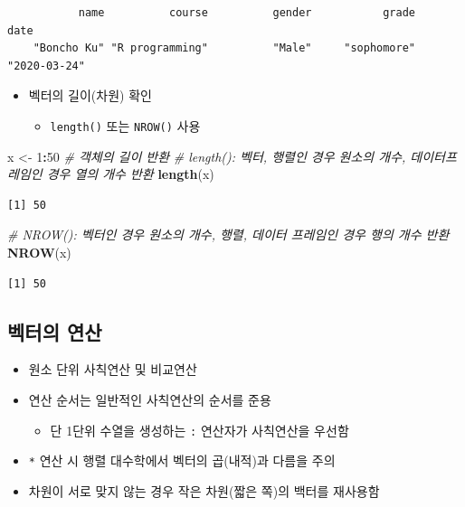 \documentclass[
  11pt,
]{krantz}
\newenvironment{Shaded}{\begin{snugshade}}{\end{snugshade}}
\newcommand{\CommentTok}[1]{\textcolor[rgb]{0.37,0.37,0.37}{\textit{#1}}}
\newcommand{\DecValTok}[1]{\textcolor[rgb]{0.06,0.06,0.06}{#1}}
\newcommand{\KeywordTok}[1]{\textcolor[rgb]{0.27,0.27,0.27}{\textbf{#1}}}
\newcommand{\NormalTok}[1]{#1}
\newcommand{\OperatorTok}[1]{\textcolor[rgb]{0.43,0.43,0.43}{\textbf{#1}}}
\newcommand{\StringTok}[1]{\textcolor[rgb]{0.5,0.5,0.5}{#1}}
\providecommand{\tightlist}{%
  \setlength{\itemsep}{0pt}\setlength{\parskip}{0pt}}
\begin{document}
\begin{verbatim}
           name          course          gender           grade            date 
    "Boncho Ku" "R programming"          "Male"     "sophomore"    "2020-03-24" 
\end{verbatim}

\normalsize

\begin{itemize}
\tightlist
\item
  벡터의 길이(차원) 확인

  \begin{itemize}
  \tightlist
  \item
    \texttt{length()} 또는 \texttt{NROW()} 사용
  \end{itemize}
\end{itemize}

\footnotesize

\begin{Shaded}
\begin{Highlighting}[]
\NormalTok{x <-}\StringTok{ }\DecValTok{1}\OperatorTok{:}\DecValTok{50}
\CommentTok{# 객체의 길이 반환}
\CommentTok{# length(): 벡터, 행렬인 경우 원소의 개수, 데이터프레임인 경우 열의 개수 반환}
\KeywordTok{length}\NormalTok{(x) }
\end{Highlighting}
\end{Shaded}

\begin{verbatim}
[1] 50
\end{verbatim}

\begin{Shaded}
\begin{Highlighting}[]
\CommentTok{# NROW(): 벡터인 경우 원소의 개수, 행렬, 데이터 프레임인 경우 행의 개수 반환}
\KeywordTok{NROW}\NormalTok{(x)}
\end{Highlighting}
\end{Shaded}

\begin{verbatim}
[1] 50
\end{verbatim}

\normalsize

\hypertarget{uxbca1uxd130uxc758-uxc5f0uxc0b0}{%
\subsection{벡터의 연산}\label{uxbca1uxd130uxc758-uxc5f0uxc0b0}}

\begin{itemize}
\tightlist
\item
  원소 단위 사칙연산 및 비교연산
\item
  연산 순서는 일반적인 사칙연산의 순서를 준용

  \begin{itemize}
  \tightlist
  \item
    단 1단위 수열을 생성하는 \texttt{:} 연산자가 사칙연산을 우선함
  \end{itemize}
\item
  \texttt{*} 연산 시 행렬 대수학에서 벡터의 곱(내적)과 다름을 주의
\item
  차원이 서로 맞지 않는 경우 작은 차원(짧은 쪽)의 백터를 재사용함
\end{itemize}
\end{document}
